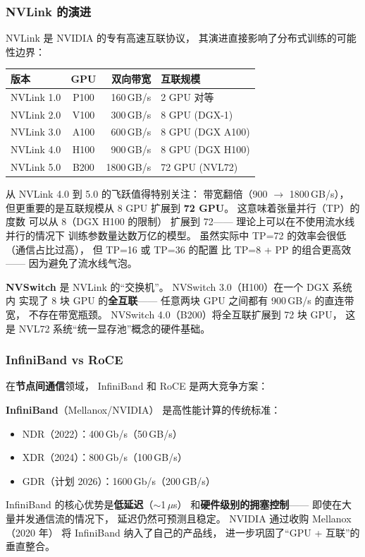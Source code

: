 \subsubsection{NVLink 的演进}

NVLink 是 NVIDIA 的专有高速互联协议，
其演进直接影响了分布式训练的可能性边界：

\begin{center}
\small
\begin{tabular}{lcrl}
\hline
\textbf{版本} & \textbf{GPU} & \textbf{双向带宽} & \textbf{互联规模} \\
\hline
NVLink 1.0 & P100 & 160\,GB/s & 2 GPU 对等 \\
NVLink 2.0 & V100 & 300\,GB/s & 8 GPU (DGX-1) \\
NVLink 3.0 & A100 & 600\,GB/s & 8 GPU (DGX A100) \\
NVLink 4.0 & H100 & 900\,GB/s & 8 GPU (DGX H100) \\
NVLink 5.0 & B200 & 1800\,GB/s & 72 GPU (NVL72) \\
\hline
\end{tabular}
\end{center}

从 NVLink 4.0 到 5.0 的飞跃值得特别关注：
带宽翻倍（900 $\to$ 1800\,GB/s），
但更重要的是互联规模从 8 GPU 扩展到 \textbf{72 GPU}。
这意味着张量并行（TP）的度数
可以从 8（DGX H100 的限制）
扩展到 72——
理论上可以在不使用流水线并行的情况下
训练参数量达数万亿的模型。
虽然实际中 TP=72 的效率会很低
（通信占比过高），
但 TP=16 或 TP=36 的配置
比 TP=8 + PP 的组合更高效——
因为避免了流水线气泡。

\textbf{NVSwitch} 是 NVLink 的``交换机''。
NVSwitch 3.0（H100）在一个 DGX 系统内
实现了 8 块 GPU 的\textbf{全互联}——
任意两块 GPU 之间都有 900\,GB/s 的直连带宽，
不存在带宽瓶颈。
NVSwitch 4.0（B200）将全互联扩展到 72 块 GPU，
这是 NVL72 系统``统一显存池''概念的硬件基础。

\subsubsection{InfiniBand vs RoCE}

在\textbf{节点间通信}领域，
InfiniBand 和 RoCE 是两大竞争方案：

\textbf{InfiniBand}（Mellanox/NVIDIA）
是高性能计算的传统标准：
\begin{itemize}[noitemsep]
  \item NDR（2022）：400\,Gb/s（50\,GB/s）
  \item XDR（2024）：800\,Gb/s（100\,GB/s）
  \item GDR（计划 2026）：1600\,Gb/s（200\,GB/s）
\end{itemize}
InfiniBand 的核心优势是\textbf{低延迟}（$\sim$1\,$\mu$s）
和\textbf{硬件级别的拥塞控制}——
即使在大量并发通信流的情况下，
延迟仍然可预测且稳定。
NVIDIA 通过收购 Mellanox（2020 年）
将 InfiniBand 纳入了自己的产品线，
进一步巩固了``GPU + 互联''的垂直整合。


